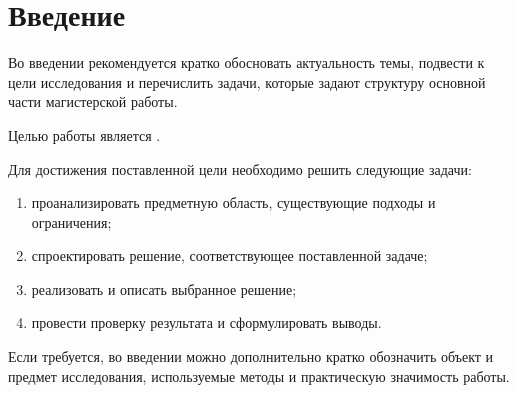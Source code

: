 \chapter*{Введение}

Во введении рекомендуется кратко обосновать актуальность темы, подвести к
цели исследования и перечислить задачи, которые задают структуру основной
части магистерской работы.

Целью работы является \researchPurpose.

Для достижения поставленной цели необходимо решить следующие задачи:
\begin{enumerate}
\item проанализировать предметную область, существующие подходы и ограничения;
\item спроектировать решение, соответствующее поставленной задаче;
\item реализовать и описать выбранное решение;
\item провести проверку результата и сформулировать выводы.
\end{enumerate}

Если требуется, во введении можно дополнительно кратко обозначить объект и
предмет исследования, используемые методы и практическую значимость работы.
